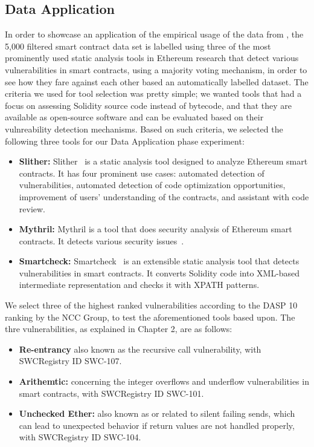 \subsection{Data Application}
	In order to showcase an application of the empirical usage of the data from \etherbase, 
	the 5,000 filtered smart contract data set is labelled using three of the most prominently used static analysis tools in Ethereum research that detect
	various vulnerabilities in smart contracts, using a majority voting mechanism, in order to see how they fare against each other based an automatically labelled dataset.
	The criteria we used for tool selection was pretty simple; we wanted tools that had a focus on assessing Solidity source code instead of bytecode,
	and that they are available as open-source software and can be evaluated based on their vulnreability detection mechanisms.
	Based on such criteria, we selected the following three tools for our Data Application phase experiment:
	\begin{itemize}
		\item \textbf{Slither:} Slither~\cite{slither} is a static analysis tool designed to analyze Ethereum smart contracts.
		It has four prominent use cases:
		automated detection of vulnerabilities, automated detection of code optimization opportunities, improvement of users' understanding of the contracts,
		and assistant with code review.
		\item \textbf{Mythril:} Mythril is a tool that does security analysis of Ethereum smart contracts. It detects various security issues~\cite{mythril}.
		\item \textbf{Smartcheck:} Smartcheck~\cite{smartcheck} is an extensible static analysis tool that detects vulnerabilities in smart contracts.
		It converts Solidity code into XML-based intermediate representation and checks it with XPATH patterns.
	\end{itemize}
	
	
	We select three of the highest ranked vulnerabilities according to the DASP 10 ranking by the NCC Group, to test the aforementioned tools based upon.
	The thre vulnerabilities, as explained in Chapter 2, are as follows:
	\begin{itemize}
		\item \textbf{Re-entrancy} also known as the recursive call vulnerability, with SWCRegistry ID SWC-107.
		\item \textbf{Arithemtic:} concerning the integer overflows and underflow vulnerabilities in smart contracts, with SWCRegistry ID SWC-101.
		\item \textbf{Unchecked Ether:} also known as or related to silent failing sends, which can lead to unexpected behavior if return values are not handled properly, with SWCRegistry ID SWC-104.
	\end{itemize} 
	
